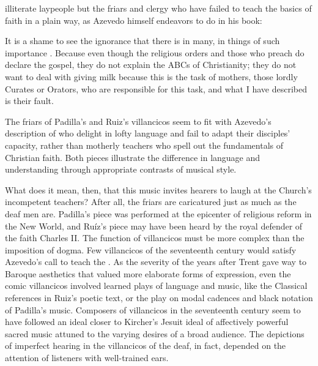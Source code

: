 illiterate laypeople but the friars and clergy who have failed to teach the
basics of faith in a plain way, as Azevedo himself endeavors to do in his book:
\begin{quoting}
    It is a shame to see the ignorance that there is in many, in things of such
    importance \Dots{}.
    Because even though the religious orders and those who preach do declare the
    gospel, they do not explain the ABCs  of Christianity;
    they do not want to deal with giving milk because this is the task of
    mothers, those lordly Curates or Orators, who are responsible for this task,
    and what I have described is their fault.%
        \Autocite
        [27: .] 
        {Azevedo:Catecismo}
\end{quoting}
The friars of Padilla's and Ruiz's villancicos seem to fit with Azevedo's
description of  who delight in lofty language and fail to
adapt their disciples' capacity, rather than motherly teachers who spell out the
fundamentals of Christian faith.
Both pieces illustrate the difference in language and understanding through
appropriate contrasts of musical style.

What does it mean, then, that this music invites hearers to laugh at the
Church's incompetent teachers? 
After all, the friars are caricatured just as much as the deaf men are.
Padilla's piece was performed at the epicenter of religious reform in the New
World, and Ruíz's piece may have been heard by the royal defender of the faith
Charles II.  %
The function of villancicos must be more complex than the imposition of dogma.
Few villancicos of the seventeenth century would satisfy Azevedo's call to teach
the .  
As the severity of the years after Trent gave way to Baroque aesthetics that
valued more elaborate forms of expression, even the comic villancicos involved
learned plays of language and music, like the Classical references in Ruiz's
poetic text, or the play on modal cadences and black notation of Padilla's
music.
Composers of villancicos in the seventeenth century seem to have followed an
ideal closer to Kircher's Jesuit ideal of affectively powerful sacred music
attuned to the varying desires of a broad audience.
The depictions of imperfect hearing in the villancicos of the deaf, in fact,
depended on the attention of listeners with well-trained ears.


